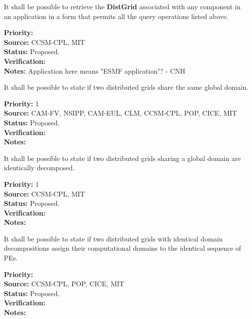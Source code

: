 
It shall be possible to retrieve the \textbf{DistGrid} associated with
any component in an application in a form that permits all the query
operations listed above.

\begin{reqlist}
{\bf Priority:} \\
{\bf Source:} CCSM-CPL, MIT \\
{\bf Status:} Proposed. \\
{\bf Verification:} \\
{\bf Notes:} Application here means "ESMF application"? - CNH
\end{reqlist}



It shall be possible to state if two distributed grids share the same
global domain.

\begin{reqlist}
{\bf Priority:} 1 \\ 
{\bf Source:} CAM-FV, NSIPP, CAM-EUL, CLM, CCSM-CPL, POP, CICE, MIT \\
{\bf Status:} Proposed. \\
{\bf Verification:} \\
{\bf Notes:}
\end{reqlist}



It shall be possible to state if two distributed grids sharing a
global domain are identically decomposed.

\begin{reqlist}
{\bf Priority:} 1 \\ 
{\bf Source:} CCSM-CPL, MIT \\
{\bf Status:} Proposed. \\
{\bf Verification:} \\
{\bf Notes:}
\end{reqlist}


It shall be possible to state if two distributed grids with identical
domain decompositions assign their computational domains to the
identical sequence of PEs.

\begin{reqlist}
{\bf Priority:} \\
{\bf Source:} CCSM-CPL, POP, CICE, MIT \\
{\bf Status:} Proposed. \\
{\bf Verification:} \\
{\bf Notes:}
\end{reqlist}

